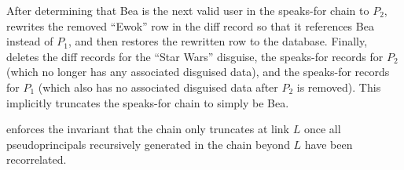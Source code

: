 \begin{enumerate}
%
After determining that Bea is the next valid user in the speaks-for chain to $P_2$,
\sys rewrites the removed ``Ewok'' row in the diff record so that it references Bea instead of $P_1$,
and then restores the rewritten row to the database.
%
Finally, \sys deletes the diff records for the ``Star Wars'' disguise, the
speaks-for records for $P_2$ (which no longer has any associated disguised
data), and the speaks-for records for $P_1$ (which also has no associated
disguised data after $P_2$ is removed).
%
This implicitly truncates the speaks-for chain to simply be Bea.
\end{enumerate}
%
\sys enforces the invariant that the chain only truncates at link
$L$ once all pseudoprincipals recursively generated in the chain beyond $L$ have
been recorrelated.
%


%


